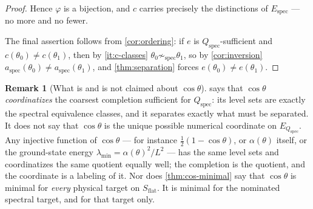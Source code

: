 \documentclass[11pt,reqno]{amsart}
\theoremstyle{plain}
\theoremstyle{definition}
\newtheorem{remark}[theorem]{Remark}
\newcommand{\Src}{S}
\begin{document}
\begin{proof}
Hence $\varphi$ is a bijection, and $c$ carries precisely the distinctions of
$E_{\mathrm{spec}}$ --- no more and no fewer.

The final assertion follows from \cref{cor:ordering}: if $e$ is $Q_{\mathrm{spec}}$-sufficient and
$c(\theta_0)\neq c(\theta_1)$, then by \eqref{it:c-classes} $\theta_0\not\sim_{\mathrm{spec}}
\theta_1$, so by \cref{cor:inversion} $a_{\mathrm{spec}}(\theta_0)\neq a_{\mathrm{spec}}
(\theta_1)$, and \cref{thm:separation} forces $e(\theta_0)\neq e(\theta_1)$.
\end{proof}

\begin{remark}[What is and is not claimed about $\cos\theta$]\label{rem:cos-caveat}
 says that $\cos\theta$ \emph{coordinatizes} the coarsest completion
sufficient for $Q_{\mathrm{spec}}$: its level sets are exactly the spectral equivalence classes,
and it separates exactly what must be separated. It does not say that $\cos\theta$ is the unique
possible numerical coordinate on $E_{Q_{\mathrm{spec}}}$. Any injective function of $\cos\theta$
--- for instance $\tfrac12(1-\cos\theta)$, or $\alpha(\theta)$ itself, or the ground-state energy
$\lambda_{\min}=\alpha(\theta)^2/L^2$ --- has the same level sets and coordinatizes the same
quotient equally well; the completion is the quotient, and the coordinate is a labeling of it.
Nor does \cref{thm:cos-minimal} say that $\cos\theta$ is minimal for \emph{every} physical target
on $\Src_{\mathrm{flat}}$. It is minimal for the nominated spectral target, and for that target
only.
\end{remark}
\end{document}
